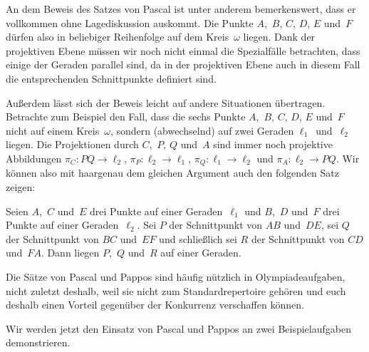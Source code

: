 An dem Beweis des Satzes von Pascal ist unter anderem bemerkenswert, dass er vollkommen ohne Lagediskussion auskommt. Die Punkte $A$,~$B$, $C$, $D$, $E$ und~$F$ dürfen also in beliebiger Reihenfolge auf dem Kreis~$\omega$ liegen. Dank der projektiven Ebene müssen wir noch nicht einmal die Spezialfälle betrachten, dass einige der Geraden parallel sind, da in der projektiven Ebene auch in diesem Fall die entsprechenden Schnittpunkte definiert sind.

Außerdem lässt sich der Beweis leicht auf andere Situationen übertragen. Betrachte zum Beispiel den Fall, dass die sechs Punkte $A$,~$B$, $C$, $D$, $E$ und~$F$ nicht auf einem Kreis~$\omega$, sondern (abwechselnd) auf zwei Geraden $\ell_1$~und~$\ell_2$ liegen. Die Projektionen durch $C$,~$P$, $Q$ und~$A$ sind immer noch projektive Abbildungen $\pi_C\colon PQ\to \ell_2$, $\pi_P\colon \ell_2\to \ell_1$, $\pi_Q\colon \ell_1\to\ell_2$ und $\pi_A\colon \ell_2\to PQ$. Wir können also mit haargenau dem gleichen Argument auch den folgenden Satz zeigen:

\begin{satzmitnamen}
	Seien $A$,~$C$ und~$E$ drei Punkte auf einer Geraden~$\ell_1$ und $B$,~$D$ und~$F$ drei Punkte auf einer Geraden~$\ell_2$. Sei $P$ der Schnittpunkt von $AB$ und~$DE$, sei $Q$ der Schnittpunkt von $BC$ und~$EF$ und schließlich sei $R$ der Schnittpunkt von $CD$ und~$FA$. Dann liegen $P$,~$Q$ und~$R$ auf einer Geraden.
\end{satzmitnamen}

Die Sätze von Pascal und Pappos sind häufig nützlich in Olympiadeaufgaben, nicht zuletzt deshalb, weil sie nicht zum Standardrepertoire gehören und euch deshalb einen Vorteil gegenüber der Konkurrenz verschaffen können.

Wir werden jetzt den Einsatz von Pascal und Pappos an zwei Beispielaufgaben demonstrieren.

